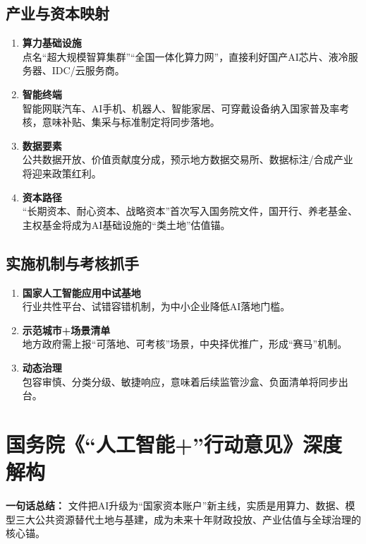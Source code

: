 \subsection{产业与资本映射}
\begin{enumerate}[leftmargin=*, nosep]
    \item \textbf{算力基础设施}  \\
    点名“超大规模智算集群”“全国一体化算力网”，直接利好国产AI芯片、液冷服务器、IDC/云服务商。
    \item \textbf{智能终端}  \\
    {\color{red}智能网联汽车、AI手机、机器人、智能家居、可穿戴设备纳入国家普及率考核，意味补贴、集采与标准制定将同步落地。}
    \item \textbf{数据要素}  \\
    公共数据开放、价值贡献度分成，预示地方数据交易所、数据标注/合成产业将迎来政策红利。
    \item \textbf{资本路径}  \\
    {\color{red}“长期资本、耐心资本、战略资本”首次写入国务院文件，国开行、养老基金、主权基金将成为AI基础设施的“类土地”估值锚。}
\end{enumerate}

\subsection{实施机制与考核抓手}
\begin{enumerate}[leftmargin=*, nosep]
    \item \textbf{国家人工智能应用中试基地}  \\
    行业共性平台、试错容错机制，为中小企业降低AI落地门槛。
    \item \textbf{示范城市+场景清单}  \\
    {\color{red}地方政府需上报“可落地、可考核”场景，中央择优推广，形成“赛马”机制。}
    \item \textbf{动态治理}  \\
    包容审慎、分类分级、敏捷响应，意味着后续监管沙盒、负面清单将同步出台。
\end{enumerate}


\section{国务院《“人工智能+”行动意见》深度解构}

\textbf{一句话总结：}  
文件把AI升级为“国家资本账户”新主线，实质是用算力、数据、模型三大公共资源替代土地与基建，成为未来十年财政投放、产业估值与全球治理的核心锚。

